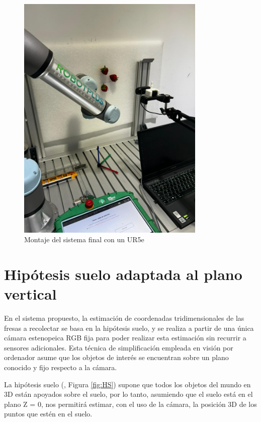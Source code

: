 \begin{figure} [H]
    \begin{center}
      \includegraphics[width=9cm]{figs/Pruebas plano vertical deteccion multiple_editada.jpeg}
    \end{center}
    \caption{Montaje del sistema final con un UR5e}
    \label{fig:montaje_final}
\end{figure}
  

\section{Hipótesis suelo adaptada al plano vertical}
\label{sec:HS_vertical}

En el sistema propuesto, la estimación de coordenadas tridimensionales de las fresas a recolectar se basa en la hipótesis suelo, y se realiza a partir de una única cámara estenopeica RGB fija para poder realizar esta estimación sin recurrir a sensores adicionales. Esta técnica de simplificación empleada en visión por ordenador asume que los objetos de interés se encuentran sobre un plano conocido y fijo respecto a la cámara.

La hipótesis suelo (\cite{Vega21}, Figura \ref{fig:HS}) supone que todos los objetos del mundo en 3D están apoyados sobre el suelo, por lo tanto, asumiendo que el suelo está en el plano Z = 0, nos permitirá estimar, con el uso de la cámara, la posición 3D de los puntos que estén en el suelo.

